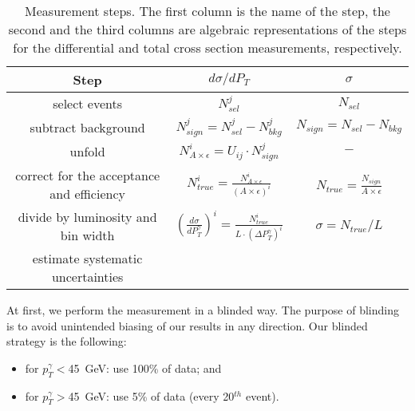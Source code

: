 \begin{table}[h]
  \small
  \begin{center}
  \caption{Measurement steps. The first column is the name of the step, the second and the third columns are algebraic representations of the steps for the differential and total cross section measurements, respectively. }
  \begin{tabular}{|c|c|c|}
    \hline
    Step & $d\sigma/dP_{T}$ & $\sigma$ \\ \hline
    select events & $N_{sel}^j$ &    $N_{sel}$       \\ \hline
    subtract background & $N_{sign}^j = N_{sel}^j - N_{bkg}^j$ &    $N_{sign}=N_{sel}-N_{bkg}$       \\ \hline
    unfold   & $N_{A\times\epsilon}^i = U_{ij} \cdot N_{sign}^j$ &    $-$       \\ \hline
    correct for the acceptance and efficiency & $N_{true}^i = \frac{N_{A\times\epsilon}^i}{(A \times\epsilon)^i}$ &  $N_{true}=\frac{N_{sign}}{A\times\epsilon}$       \\ \hline
    divide by luminosity and bin width & $ \left( \frac{d\sigma}{dP_{T}^\gamma} \right) ^i = \frac{N_{true}^i}{L \cdot (\Delta P_T^\gamma)^i}$  &  $\sigma = N_{true}/L$       \\ \hline
    estimate systematic uncertainties &  &         \\ \hline
  \end{tabular}
  \label{tab:analysisOutline}
  \end{center}
\end{table}

At first, we perform the measurement in a blinded way. The purpose of blinding is to avoid unintended biasing of our results in any direction. Our blinded strategy is the following:
\begin{itemize}
  \item for $p_T^{\gamma}<$45~GeV: use 100\% of data; and
  \item for $p_T^{\gamma}>$45~GeV: use 5\% of data (every 20$^{th}$ event).
\end{itemize}


